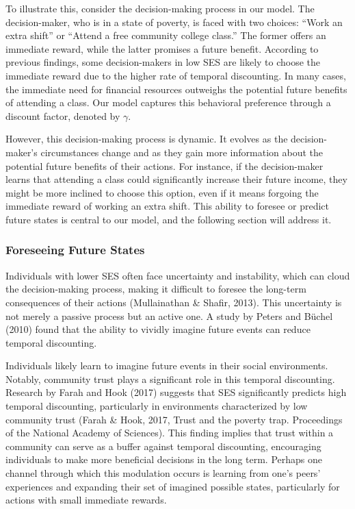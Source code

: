 \documentclass[
]{article}
\begin{document}
To illustrate this, consider the decision-making process in our model.
The decision-maker, who is in a state of poverty, is faced with two
choices: ``Work an extra shift'' or ``Attend a free community college
class.'' The former offers an immediate reward, while the latter
promises a future benefit. According to previous findings, some
decision-makers in low SES are likely to choose the immediate reward due
to the higher rate of temporal discounting. In many cases, the immediate
need for financial resources outweighs the potential future benefits of
attending a class. Our model captures this behavioral preference through
a discount factor, denoted by \(\gamma\).

However, this decision-making process is dynamic. It evolves as the
decision-maker's circumstances change and as they gain more information
about the potential future benefits of their actions. For instance, if
the decision-maker learns that attending a class could significantly
increase their future income, they might be more inclined to choose this
option, even if it means forgoing the immediate reward of working an
extra shift. This ability to foresee or predict future states is central
to our model, and the following section will address it.

\hypertarget{foreseeing-future-states}{%
\subsubsection{Foreseeing Future
States}\label{foreseeing-future-states}}

Individuals with lower SES often face uncertainty and instability, which
can cloud the decision-making process, making it difficult to foresee
the long-term consequences of their actions (Mullainathan \& Shafir,
2013). This uncertainty is not merely a passive process but an active
one. A study by Peters and Büchel (2010) found that the ability to
vividly imagine future events can reduce temporal discounting.

Individuals likely learn to imagine future events in their social
environments. Notably, community trust plays a significant role in this
temporal discounting. Research by Farah and Hook (2017) suggests that
SES significantly predicts high temporal discounting, particularly in
environments characterized by low community trust (Farah \& Hook, 2017,
Trust and the poverty trap. Proceedings of the National Academy of
Sciences). This finding implies that trust within a community can serve
as a buffer against temporal discounting, encouraging individuals to
make more beneficial decisions in the long term. Perhaps one channel
through which this modulation occurs is learning from one's peers'
experiences and expanding their set of imagined possible states,
particularly for actions with small immediate rewards.
\end{document}
